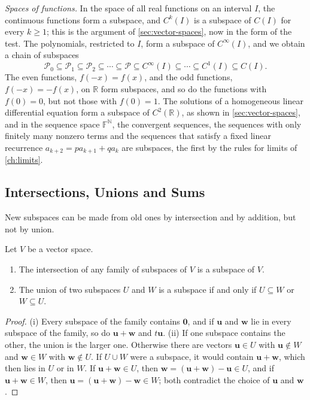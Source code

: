 \emph{Spaces of functions.} In the space of all real functions on an interval $I$, the continuous functions form a subspace, and $C^k(I)$ is a subspace of $C(I)$ for every $k\ge1$; this is the argument of \cref{sec:vector-spaces}, now in the form of the test. The polynomials, restricted to $I$, form a subspace of $C^\infty(I)$, and we obtain a chain of subspaces
\[
\mathcal P_0\subseteq\mathcal P_1\subseteq\mathcal P_2\subseteq\cdots\subseteq\mathcal P\subseteq C^\infty(I)\subseteq\cdots\subseteq C^1(I)\subseteq C(I).
\]
The even functions, $f(-x)=f(x)$, and the odd functions, $f(-x)=-f(x)$, on $\mathbb R$ form subspaces, and so do the functions with $f(0)=0$, but not those with $f(0)=1$. The solutions of a homogeneous linear differential equation form a subspace of $C^2(\mathbb R)$, as shown in \cref{sec:vector-spaces}, and in the sequence space $\mathbb F^{\mathbb N}$, the convergent sequences, the sequences with only finitely many nonzero terms and the sequences that satisfy a fixed linear recurrence $a_{k+2}=pa_{k+1}+qa_k$ are subspaces, the first by the rules for limits of \cref{ch:limits}.

\subsection{Intersections, Unions and Sums}

New subspaces can be made from old ones by intersection and by addition, but not by union.

\begin{proposition}
\label{prop:intersection}
Let $V$ be a vector space.
\begin{enumerate}
\item The intersection of any family of subspaces of $V$ is a subspace of $V$.
\item The union of two subspaces $U$ and $W$ is a subspace if and only if $U\subseteq W$ or $W\subseteq U$.
\end{enumerate}
\end{proposition}

\begin{proof}
(i) Every subspace of the family contains $\mathbf 0$, and if $\mathbf u$ and $\mathbf w$ lie in every subspace of the family, so do $\mathbf u+\mathbf w$ and $t\mathbf u$. (ii) If one subspace contains the other, the union is the larger one. Otherwise there are vectors $\mathbf u\in U$ with $\mathbf u\notin W$ and $\mathbf w\in W$ with $\mathbf w\notin U$. If $U\cup W$ were a subspace, it would contain $\mathbf u+\mathbf w$, which then lies in $U$ or in $W$. If $\mathbf u+\mathbf w\in U$, then $\mathbf w=(\mathbf u+\mathbf w)-\mathbf u\in U$, and if $\mathbf u+\mathbf w\in W$, then $\mathbf u=(\mathbf u+\mathbf w)-\mathbf w\in W$; both contradict the choice of $\mathbf u$ and $\mathbf w$.
\end{proof}

